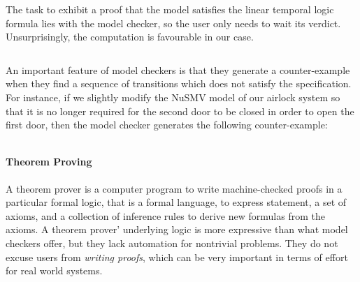 \begin{example}
  The task to exhibit a proof that the model satisfies the linear temporal logic
  formula lies with the model checker, so the user only needs to wait its
  verdict.
  Unsurprisingly, the computation is favourable in our case.

  \inputminted[linenos=false]{coq}{Listings/Airlock-out.nusmv}

  An important feature of model checkers is that they generate a counter-example
  when they find a sequence of transitions which does not satisfy the
  specification.
  For instance, if we slightly modify the NuSMV model of our airlock system so
  that it is no longer required for the second door to be closed in order to
  open the first door, then the model checker generates the following
  counter-example:

  \inputminted[linenos=false]{coq}{Listings/Airlock-counter.nusmv}
\end{example}

\paragraph{Theorem Proving}
%
A theorem prover is a computer program to write machine-checked proofs in a
particular formal logic, that is a formal language, to express statement, a set
of axioms, and a collection of inference rules to derive new formulas from the
axioms. 
%
A theorem prover' underlying logic is more expressive than what model checkers
offer, but they lack automation for nontrivial problems.
%
They do not excuse users from \emph{writing proofs}, which can be very important
in terms of effort for real world systems.

